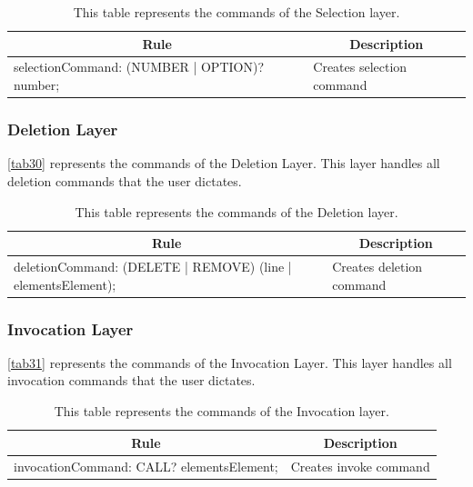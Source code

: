 \begin{table}[H]
	\centering
	\begin{tabular}{|p{8cm}|p{7cm}|}
		\hline
		\multicolumn{1}{|c|}{{\bf Rule}}             & \multicolumn{1}{c|}{{\bf Description}} \\ \hline
		selectionCommand: (NUMBER | OPTION)? number; & Creates selection command              \\ \hline
	\end{tabular}
	\caption{This table represents the commands of the Selection layer.}
	\label{tab29}
\end{table}

\subsubsection{Deletion Layer}
\autoref{tab30} represents the commands of the Deletion Layer.  This layer handles all deletion commands that the user dictates.

\begin{table}[H]
	\centering
	\begin{tabular}{|p{8cm}|p{7cm}|}
		\hline
		\multicolumn{1}{|c|}{{\bf Rule}}                             & \multicolumn{1}{c|}{{\bf Description}} \\ \hline
		deletionCommand: (DELETE | REMOVE) (line | elementsElement); & Creates deletion command               \\ \hline
	\end{tabular}
	\caption{This table represents the commands of the Deletion layer.}
	\label{tab30}
\end{table}

\subsubsection{Invocation Layer}
\autoref{tab31} represents the commands of the Invocation Layer.  This layer handles all invocation commands that the user dictates.

\begin{table}[H]
	\centering
	\begin{tabular}{|p{8cm}|p{7cm}|}
		\hline
		\multicolumn{1}{|c|}{{\bf Rule}}          & \multicolumn{1}{c|}{{\bf Description}} \\ \hline
		invocationCommand: CALL? elementsElement; & Creates invoke command                 \\ \hline
	\end{tabular}
	\caption{This table represents the commands of the Invocation layer.}
	\label{tab31}
\end{table}

